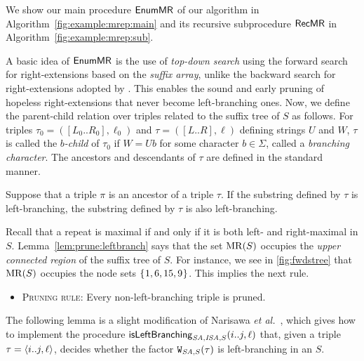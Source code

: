 


We show our main procedure $\textsf{EnumMR}$ of our algorithm in Algorithm~\ref{fig:example:mrep:main} and its recursive subprocedure $\textsf{RecMR}$ in Algorithm~\ref{fig:example:mrep:sub}. 

A basic idea of $\textsf{EnumMR}$ is the use of \textit{top-down search} using the forward search for right-extensions based on the \textit{suffix array}, unlike the backward search for right-extensions adopted by \TDBW.
This enables the sound and early pruning of hopeless right-extensions that never become left-branching ones.
Now, we define the parent-child relation over triples related to the suffix tree of $S$ as follows. For triples $\tau_0 = ([L_0..R_0], \ell_0)$ and $\tau = ([L..R], \ell)$ defining strings $U$ and $W$, $\tau$ is called the \textit{$b$-child} of $\tau_0$ if $W = Ub$ for some character $b \in \Sigma$, called a \textit{branching character}. The ancestors and descendants of $\tau$ are defined in the standard manner.

\begin{lemma}\label{lem:prune:leftbranch}
Suppose that a triple $\pi$ is an ancestor of a triple $\tau$. If the substring defined by $\tau$ is left-branching, the substring defined by $\tau$ is also left-branching. 
\end{lemma}

Recall that a repeat is maximal if and only if it is both left- and right-maximal in $S$. Lemma~\cref{lem:prune:leftbranch} says that the set $\mathrm{MR}(S)$ occupies the \textit{upper connected region} of the suffix tree of $S$. For instance, we see in \cref{fig:fwdstree} that $\mathrm{MR}(S)$ occupies the node sets $\{\kern0.05em1,6,15,9\kern0.05em\}$. 
This implies the next rule.

\begin{itemize}\item[]
\quad\textsc{Pruning rule}: {Every non-left-branching triple is pruned.}
\end{itemize}


The following lemma is a slight modification of Narisawa \textit{et al.}~\cite[Lemma~10]{narisawa2007efficient}, which gives how to implement the procedure $\mbox{\textsf{isLeftBranching}}_{{\mathit{SA}, \mathit{ISA}, S}}(i..j, \ell)$ that, given a triple $\tau = \langle i..j, \ell\rangle$, decides whether the factor $\mathtt{W}_{{\mathit{SA}, S}}(\tau)$ is left-branching in an $S$. 
 

